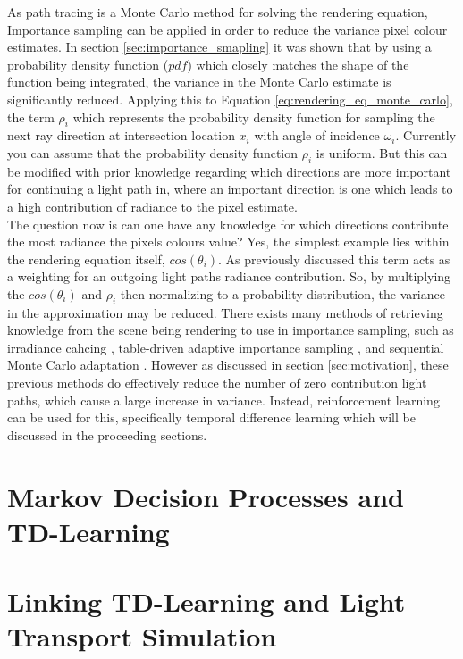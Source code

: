 \documentclass[ %
                    author={Callum Pearce},
                supervisor={Dr. Neill Campbell},
                    degree={MEng},
                     title={How effective are Temporal difference learning methods for reducing the number of zero contribution light paths while still accurately approximating Global Illumination in Path tracing?},
                  subtitle={},
                      type={research},
                      year={2019} ]{dissertation}
\begin{document}
As path tracing is a Monte Carlo method for solving the rendering equation, Importance sampling can be applied in order to reduce the variance pixel colour estimates. In section \ref{sec:importance_smapling} it was shown that by using a probability density function ($pdf$) which closely matches the shape of the function being integrated, the variance in the Monte Carlo estimate is significantly reduced. Applying this to Equation \ref{eq:rendering_eq_monte_carlo}, the term $\rho_i$ which represents the probability density function for sampling the next ray direction at intersection location $x_i$ with angle of incidence $\omega_i$. Currently you can assume that the probability density function $\rho_i$ is uniform. But this can be modified with prior knowledge regarding which directions are more important for continuing a light path in, where an important direction is one which leads to a high contribution of radiance to the pixel estimate.\\

The question now is can one have any knowledge for which directions contribute the most radiance the pixels colours value? Yes, the simplest example lies within the rendering equation itself, $cos(\theta_i)$. As previously discussed this term acts as a weighting for an outgoing light paths radiance contribution. So, by multiplying the  $cos(\theta_i)$ and $\rho_i$ then normalizing to a probability distribution, the variance in the approximation may be reduced. There exists many methods of retrieving knowledge from the scene being rendering to use in importance sampling, such as irradiance cahcing \cite{bashford2012significance}, table-driven adaptive importance sampling \cite{cline2008table}, and sequential Monte Carlo adaptation \cite{pegoraro2008towards}. However as discussed in section \ref{sec:motivation}, these previous methods do effectively reduce the number of zero contribution light paths, which cause a large increase in variance. Instead, reinforcement learning can be used for this,  specifically temporal difference learning which will be discussed in the proceeding sections. 

\section{Markov Decision Processes and TD-Learning}

\section{Linking TD-Learning and Light Transport Simulation}
\end{document}
